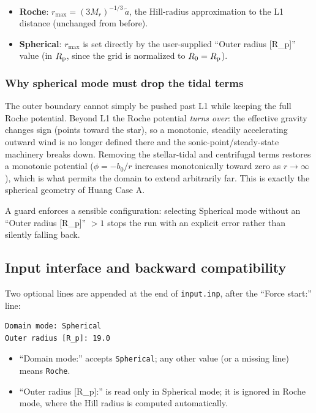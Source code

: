 \documentclass[english,a4paper]{kiseon_memo}
\begin{document}
\begin{itemize}
\item \textbf{Roche}: $r_{\max} = (3 M_r)^{-1/3}\,\tilde a$, the Hill-radius
  approximation to the L1 distance (unchanged from before).
\item \textbf{Spherical}: $r_{\max}$ is set directly by the user-supplied
  ``Outer radius [R\_p]'' value (in $R_{\rm p}$, since the grid is normalized
  to $R_0=R_{\rm p}$).
\end{itemize}

\subsubsection{Why spherical mode must drop the tidal terms}

The outer boundary cannot simply be pushed past L1 while keeping the full Roche
potential. Beyond L1 the Roche potential \emph{turns over}: the effective
gravity changes sign (points toward the star), so a monotonic, steadily
accelerating outward wind is no longer defined there and the
sonic-point/steady-state machinery breaks down. Removing the stellar-tidal and
centrifugal terms restores a monotonic potential ($\phi=-b_0/r$ increases
monotonically toward zero as $r\to\infty$), which is what permits the domain to
extend arbitrarily far. This is exactly the spherical geometry of Huang Case A.

A guard enforces a sensible configuration: selecting Spherical mode without an
``Outer radius [R\_p]'' $>1$ stops the run with an explicit error rather than
silently falling back.

\subsection{Input interface and backward compatibility}

Two optional lines are appended at the end of \texttt{input.inp}, after the
``Force start:'' line:

\begin{verbatim}
Domain mode: Spherical
Outer radius [R_p]: 19.0
\end{verbatim}

\begin{itemize}
\item ``Domain mode:'' accepts \texttt{Spherical}; any other value (or a
  missing line) means \texttt{Roche}.
\item ``Outer radius [R\_p]:'' is read only in Spherical mode; it is ignored
  in Roche mode, where the Hill radius is computed automatically.
\end{itemize}
\end{document}
